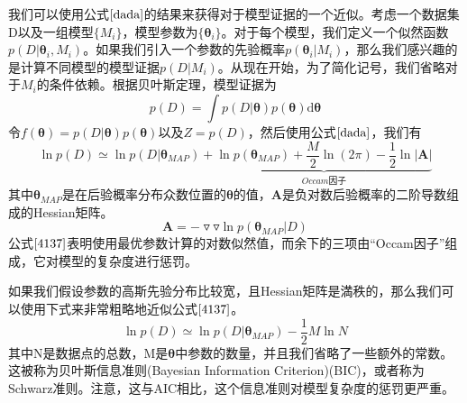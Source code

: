 我们可以使用公式$\ref{dada}$的结果来获得对于模型证据的一个近似。考虑一个数据集D以及一组模型$\{M_i\}$，模型参数为$\{\boldsymbol{\theta}_i\}$。对于每个模型，我们定义一个似然函数$p(D|\boldsymbol{\theta}_i,M_i)$。如果我们引入一个参数的先验概率$p(\boldsymbol{\theta}_i|M_i)$，那么我们感兴趣的是计算不同模型的模型证据$p(D|M_i)$。从现在开始，为了简化记号，我们省略对于$M_i$的条件依赖。根据贝叶斯定理，模型证据为
\begin{equation}
	p(D)=\int p(D|\boldsymbol{\theta})p(\boldsymbol{\theta})\mathrm{d}\boldsymbol{\theta}
\end{equation}
令$f(\boldsymbol{\theta})=p(D|\boldsymbol{\theta})p(\boldsymbol{\theta})$以及$Z=p(D)$，然后使用公式$\ref{dada}$，我们有
\begin{equation}
\label{4137}
	\ln p(D)\simeq \ln p(D|\boldsymbol{\theta}_{MAP})+\underbrace{\ln p(\boldsymbol{\theta}_{MAP})+\frac{M}{2}\ln (2\pi) -\frac{1}{2}\ln |\boldsymbol{A}|}_{Occam\text{因子}}	
\end{equation}
其中$\boldsymbol{\theta}_{MAP}$是在后验概率分布众数位置的$\boldsymbol{\theta}$的值，$\boldsymbol{A}$是负对数后验概率的二阶导数组成的Hessian矩阵。
\begin{equation}
	\boldsymbol{A}=-\triangledown\triangledown \ln p(\boldsymbol{\theta}_{MAP}|D)
\end{equation}
公式$\ref{4137}$表明使用最优参数计算的对数似然值，而余下的三项由“Occam因子”组成，它对模型的复杂度进行惩罚。

如果我们假设参数的高斯先验分布比较宽，且Hessian矩阵是満秩的，那么我们可以使用下式来非常粗略地近似公式$\ref{4137}$。
\begin{equation}
	\ln p(D)\simeq \ln p(D|\boldsymbol{\theta}_{MAP})-\frac{1}{2}M\ln N
\end{equation}
其中N是数据点的总数，M是$\boldsymbol{\theta}$中参数的数量，并且我们省略了一些额外的常数。这被称为贝叶斯信息准则(Bayesian Information Criterion)(BIC)，或者称为Schwarz准则。注意，这与AIC相比，这个信息准则对模型复杂度的惩罚更严重。